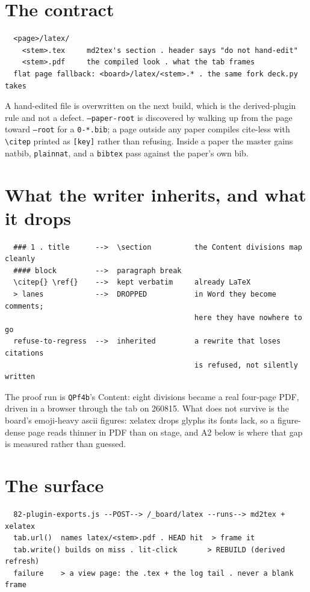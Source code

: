 
\section{The contract}
\begin{verbatim}
  <page>/latex/
    <stem>.tex     md2tex's section . header says "do not hand-edit"
    <stem>.pdf     the compiled look . what the tab frames
  flat page fallback: <board>/latex/<stem>.* . the same fork deck.py takes
\end{verbatim}
A hand-edited file is overwritten on the next build, which is the derived-plugin rule and not a defect. \texttt{--paper-root} is discovered by walking up from the page toward \texttt{--root} for a \texttt{0-*.bib}; a page outside any paper compiles cite-less with \texttt{\textbackslash{}citep} printed as \texttt{[key]} rather than refusing. Inside a paper the master gains natbib, \texttt{plainnat}, and a \texttt{bibtex} pass against the paper's own bib.

\section{What the writer inherits, and what it drops}
\begin{verbatim}
  ### 1 . title      -->  \section          the Content divisions map cleanly
  #### block         -->  paragraph break
  \citep{} \ref{}    -->  kept verbatim     already LaTeX
  > lanes            -->  DROPPED           in Word they become comments;
                                            here they have nowhere to go
  refuse-to-regress  -->  inherited         a rewrite that loses citations
                                            is refused, not silently written
\end{verbatim}
The proof run is \texttt{QPf4b}'s Content: eight divisions became a real four-page PDF, driven in a browser through the tab on 260815. What does not survive is the board's emoji-heavy ascii figures: xelatex drops glyphs its fonts lack, so a figure-dense page reads thinner in PDF than on stage, and A2 below is where that gap is measured rather than guessed.

\section{The surface}
\begin{verbatim}
  82-plugin-exports.js --POST--> /_board/latex --runs--> md2tex + xelatex
  tab.url()  names latex/<stem>.pdf . HEAD hit  > frame it
  tab.write() builds on miss . lit-click       > REBUILD (derived refresh)
  failure    > a view page: the .tex + the log tail . never a blank frame
\end{verbatim}
